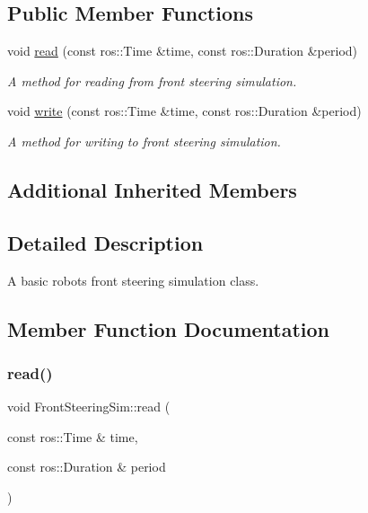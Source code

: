 \subsection*{Public Member Functions}
\begin{DoxyCompactItemize}
\item 
void \hyperlink{classFrontSteeringSim_ac9eceb29112f8238e344cd467fae9814}{read} (const ros\+::\+Time \&time, const ros\+::\+Duration \&period)
\begin{DoxyCompactList}\small\item\em A method for reading from front steering simulation. \end{DoxyCompactList}\item 
void \hyperlink{classFrontSteeringSim_afbf1c3df92319f90d5019729e9067585}{write} (const ros\+::\+Time \&time, const ros\+::\+Duration \&period)
\begin{DoxyCompactList}\small\item\em A method for writing to front steering simulation. \end{DoxyCompactList}\end{DoxyCompactItemize}
\subsection*{Additional Inherited Members}


\subsection{Detailed Description}
A basic robot\textquotesingle{}s front steering simulation class. 

\subsection{Member Function Documentation}
\mbox{\label{classFrontSteeringSim_ac9eceb29112f8238e344cd467fae9814}} 
\subsubsection{\texorpdfstring{read()}{read()}}
{\footnotesize\ttfamily void Front\+Steering\+Sim\+::read (\begin{DoxyParamCaption}\item[{const ros\+::\+Time \&}]{time,  }\item[{const ros\+::\+Duration \&}]{period }\end{DoxyParamCaption})\hspace{0.3cm}{\ttfamily [virtual]}}




